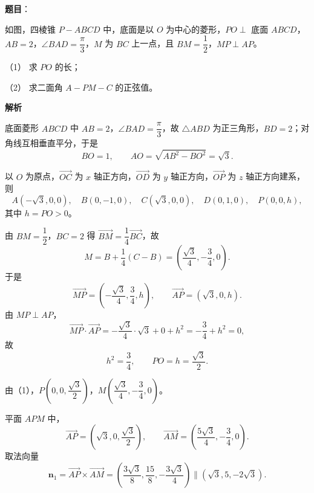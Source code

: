 \begin{answer}

\textbf{题目}：

如图，四棱锥 $P-ABCD$ 中，底面是以 $O$ 为中心的菱形，$PO\perp$ 底面 $ABCD$，$AB=2$，$\angle BAD=\dfrac\pi3$，$M$ 为 $BC$ 上一点，且 $BM=\dfrac12$，$MP\perp AP$。
\nopagebreak[4]
\begin{center}\end{center}
\nopagebreak[4]
（1） 求 $PO$ 的长；

（2） 求二面角 $A-PM-C$ 的正弦值。

\textbf{解析}


底面菱形 $ABCD$ 中 $AB=2$，$\angle BAD=\dfrac\pi3$，故 $\triangle ABD$ 为正三角形，$BD=2$；对角线互相垂直平分，于是
\nopagebreak[4]
\[BO=1,\qquad AO=\sqrt{AB^2-BO^2}=\sqrt3 .\]

以 $O$ 为原点，$\overrightarrow{OC}$ 为 $x$ 轴正方向，$\overrightarrow{OD}$ 为 $y$ 轴正方向，$\overrightarrow{OP}$ 为 $z$ 轴正方向建系，则
\nopagebreak[4]
\[A(-\sqrt3,0,0),\quad B(0,-1,0),\quad C(\sqrt3,0,0),\quad D(0,1,0),\quad P(0,0,h),\]
其中 $h=PO>0$。

由 $BM=\dfrac12$，$BC=2$ 得 $\overrightarrow{BM}=\dfrac14\overrightarrow{BC}$，故
\nopagebreak[4]
\[M=B+\frac14(C-B)=\left(\frac{\sqrt3}4,-\frac34,0\right).\]
于是
\nopagebreak[4]
\[\overrightarrow{MP}=\left(-\frac{\sqrt3}4,\frac34,h\right),\qquad \overrightarrow{AP}=(\sqrt3,0,h).\]
由 $MP\perp AP$，
\nopagebreak[4]
\[\overrightarrow{MP}\cdot\overrightarrow{AP}=-\frac{\sqrt3}4\cdot\sqrt3+0+h^2=-\frac34+h^2=0,\]
故
\nopagebreak[4]
\[h^2=\frac34,\qquad PO=h=\frac{\sqrt3}2 .\]


由（1），$P\left(0,0,\dfrac{\sqrt3}2\right)$，$M\left(\dfrac{\sqrt3}4,-\dfrac34,0\right)$。

平面 $APM$ 中，
\nopagebreak[4]
\[\overrightarrow{AP}=\left(\sqrt3,0,\frac{\sqrt3}2\right),\qquad
\overrightarrow{AM}=\left(\frac{5\sqrt3}4,-\frac34,0\right).\]
取法向量
\nopagebreak[4]
\[\boldsymbol n_1=\overrightarrow{AP}\times\overrightarrow{AM}
=\left(\frac{3\sqrt3}8,\frac{15}8,-\frac{3\sqrt3}4\right)\parallel(\sqrt3,5,-2\sqrt3).\]


\end{answer}
